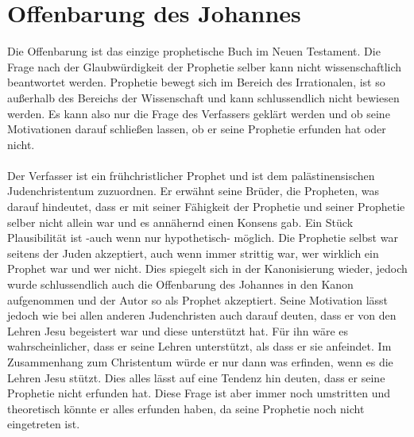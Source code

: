 \section{Offenbarung des Johannes}
Die Offenbarung ist das einzige prophetische Buch im Neuen Testament. Die Frage nach der Glaubwürdigkeit der Prophetie selber kann nicht wissenschaftlich beantwortet werden. Prophetie bewegt sich im Bereich des Irrationalen, ist so außerhalb des Bereichs der Wissenschaft und kann schlussendlich nicht bewiesen werden. Es kann also nur die Frage des Verfassers geklärt werden und ob seine Motivationen darauf schließen lassen, ob er seine Prophetie erfunden hat oder nicht.
\\~\\
Der Verfasser ist ein frühchristlicher Prophet und ist dem palästinensischen Judenchristentum zuzuordnen. Er erwähnt seine Brüder, die Propheten, was darauf hindeutet, dass er mit seiner Fähigkeit der Prophetie und seiner Prophetie selber nicht allein war und es annähernd einen Konsens gab. Ein Stück Plausibilität ist -auch wenn nur hypothetisch- möglich. Die Prophetie selbst war seitens der Juden akzeptiert, auch wenn immer strittig war, wer wirklich ein Prophet war und wer nicht. Dies spiegelt sich in der Kanonisierung wieder, jedoch wurde schlussendlich auch die Offenbarung des Johannes in den Kanon aufgenommen und der Autor so als Prophet akzeptiert. Seine Motivation lässt jedoch wie bei allen anderen Judenchristen auch darauf deuten, dass er von den Lehren Jesu begeistert war und diese unterstützt hat. Für ihn wäre es wahrscheinlicher, dass er seine Lehren unterstützt, als dass er sie anfeindet. Im Zusammenhang zum Christentum würde er nur dann was erfinden, wenn es die Lehren Jesu stützt. Dies alles lässt auf eine Tendenz hin deuten, dass er seine Prophetie nicht erfunden hat. Diese Frage ist aber immer noch umstritten und theoretisch könnte er alles erfunden haben, da seine Prophetie noch nicht eingetreten ist.

